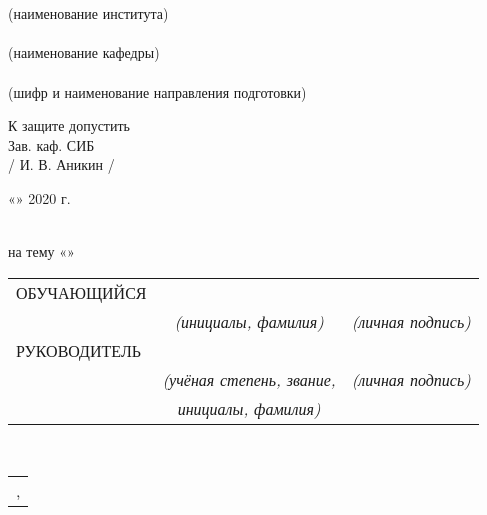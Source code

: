\emergencystretch=25pt
\begin{titlepage}
	\begin{center}

		\normalsize{\universityrus}\\
		
		\hfill \break
		\underline{\normalsize{\instituterus}}\\
		\small{(наименование института)}\\
		\underline{\normalsize{\departmentrus}}\\
		\small{(наименование кафедры)}\\
		
		\hfill\break
		\normalsize{\studiesrus}\\
		\small{(шифр и наименование направления подготовки)}
	\end{center}
	\par\smallskip
	\begin{flushright}
		\normalsize{К защите допустить}
		\\ \normalsize{Зав. каф. СИБ}
		\\ \normalsize{\underline{\hspace{1.2in}} / И. В. Аникин /}
		\\
		\rule{0cm}{1cm} \normalsize{«\underline{\hspace{0.5in}}» \underline{\hspace{1.2in}} 2020 г.}
	\end{flushright}
	
	\par\smallskip
	
	\begin{center}
		\large{\thesistyperus\\
			\large{на тему «\thesistitlerus»}}\\
		\hfill \break
	\end{center}
	\normalsize{
		\begin{tabular}{lcr}
			ОБУЧАЮЩИЙСЯ & \underline{\authorNamerus} &  \underline{\hspace{2.7in}}\\
			& \small\textit{(инициалы, фамилия)} & \small\textit{(личная подпись)}\\
			РУКОВОДИТЕЛЬ & \underline{\tutorrus} &  \underline{\hspace{2.7in}}\\
			& \small\textit{(учёная степень, звание,} & \small\textit{(личная подпись)}\\
			& \small\textit{инициалы, фамилия)}&
		\end{tabular}
	}\\
	
	\begin{table}[b!]
		\centering
		\begin{tabular}{c}
			\locationrus,  \submissiondaterus
		\end{tabular}
	\end{table}
	
	\thispagestyle{empty} %
	
\end{titlepage}
